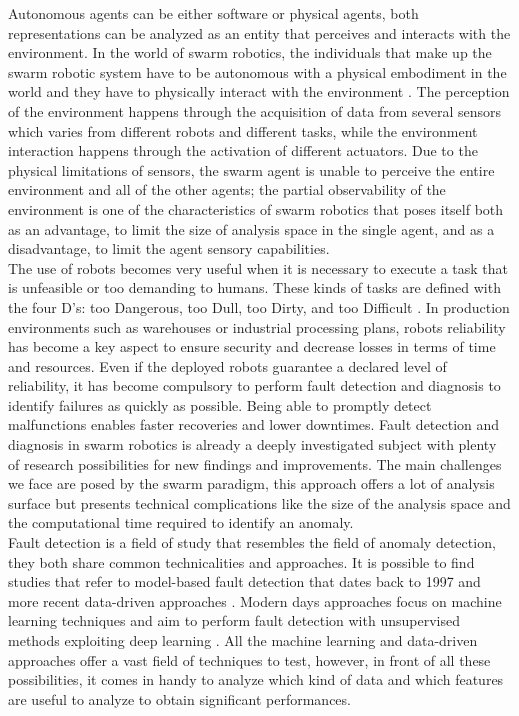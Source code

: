 \documentclass[../../Thesis.tex]{subfiles}
\begin{document}
	Autonomous agents can be either software or physical agents, both representations can be analyzed as an entity that perceives and interacts with the environment.  In the world of swarm robotics, the individuals that make up the swarm robotic system have to be autonomous with a physical embodiment in the world and they have to physically interact with the environment \cite{Sahin2005}. The perception of the environment happens through the acquisition of data from several sensors which varies from different robots and different tasks, while the environment interaction happens through the activation of different actuators. Due to the physical limitations of sensors, the swarm agent is unable to perceive the entire environment and all of the other agents; the partial observability of the environment is one of the characteristics of swarm robotics that poses itself both as an advantage, to limit the size of analysis space in the single agent, and as a disadvantage, to limit the agent sensory capabilities.  \\
	The use of robots becomes very useful when it is necessary to execute a task that is unfeasible or too demanding to humans. These kinds of tasks are defined with the four D's: too Dangerous, too Dull, too Dirty, and too Difficult \cite{Khalastchi2019}.  In production environments such as warehouses or industrial processing plans, robots reliability has become a key aspect to ensure security and decrease losses in terms of time and resources. Even if the deployed robots guarantee a declared level of reliability, it has become compulsory to perform fault detection and diagnosis to identify failures as quickly as possible.  Being able to promptly detect malfunctions enables faster recoveries and lower downtimes. Fault detection and diagnosis in swarm robotics is already a deeply investigated subject with plenty of research possibilities for new findings and improvements. The main challenges we face are posed by the swarm paradigm, this approach offers a lot of analysis surface but presents technical complications like the size of the analysis space and the computational time required to identify an anomaly. \\
	Fault detection is a field of study that resembles the field of anomaly detection, they both share common technicalities and approaches. It is possible to find studies that refer to model-based fault detection that dates back to 1997 \cite{ISERMANN1997709} and more recent data-driven approaches \cite{Khaldi2017}.  Modern days approaches focus on machine learning techniques \cite{Harrou2020} and aim to perform fault detection with unsupervised methods exploiting deep learning \cite{Azzalini2021}. All the machine learning and data-driven approaches offer a vast field of techniques to test, however, in front of all these possibilities, it comes in handy to analyze which kind of data and which features are useful to analyze to obtain significant performances. \\
\end{document}

